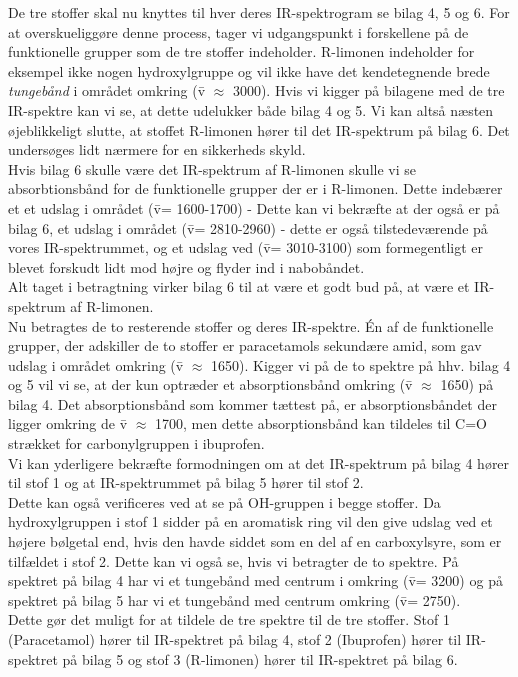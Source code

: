 De tre stoffer skal nu knyttes til hver deres IR-spektrogram se bilag 4, 5 og 6. For at overskueliggøre denne process, tager vi udgangspunkt i forskellene på de funktionelle grupper som de tre stoffer indeholder. R-limonen indeholder for eksempel ikke nogen hydroxylgruppe og vil ikke have det kendetegnende brede \emph{tungebånd} i området omkring (\={v} $\approx$ 3000). Hvis vi kigger på bilagene med de tre IR-spektre kan vi se, at dette udelukker både bilag 4 og 5. Vi kan altså næsten øjeblikkeligt slutte, at stoffet R-limonen hører til det IR-spektrum på bilag 6. Det undersøges lidt nærmere for en sikkerheds skyld. 
\\

Hvis bilag 6 skulle være det IR-spektrum af R-limonen skulle vi se absorbtionsbånd for de funktionelle grupper der er i R-limonen. Dette indebærer et et udslag i området (\={v}= 1600-1700) - Dette kan vi bekræfte at der også er på bilag 6, et udslag i området (\={v}= 2810-2960) - dette er også tilstedeværende på vores IR-spektrummet, og et udslag ved (\={v}= 3010-3100) som formegentligt er blevet forskudt lidt mod højre og flyder ind i nabobåndet. 
\\

Alt taget i betragtning virker bilag 6 til at være et godt bud på, at være et IR-spektrum af R-limonen.
\\

Nu betragtes de to resterende stoffer og deres IR-spektre. Én af de funktionelle grupper, der adskiller de to stoffer er paracetamols sekundære amid, som gav udslag i området omkring (\={v} $\approx$ 1650). Kigger vi på de to spektre på hhv. bilag 4 og 5 vil vi se, at der kun optræder et absorptionsbånd omkring (\={v} $\approx$ 1650) på bilag 4. Det absorptionsbånd som kommer tættest på, er absorptionsbåndet der ligger omkring de \={v} $\approx$ 1700, men dette absorptionsbånd kan tildeles til C=O strækket for carbonylgruppen i ibuprofen.
\\

Vi kan yderligere bekræfte formodningen om at det IR-spektrum på bilag 4 hører til stof 1 og at IR-spektrummet på bilag 5 hører til stof 2.
\\

Dette kan også verificeres ved at se på OH-gruppen i begge stoffer. Da hydroxylgruppen i stof 1 sidder på en aromatisk ring vil den give udslag ved et højere bølgetal end, hvis den havde siddet som en del af en carboxylsyre, som er tilfældet i stof 2. Dette kan vi også se, hvis vi betragter de to spektre. På spektret på bilag 4 har vi et tungebånd med centrum i omkring (\={v}= 3200) og på spektret på bilag 5 har vi et tungebånd med centrum omkring (\={v}= 2750).
\\

Dette gør det muligt for at tildele de tre spektre til de tre stoffer. Stof 1 (Paracetamol) hører til IR-spektret på bilag 4, stof 2 (Ibuprofen) hører til IR-spektret på bilag 5 og stof 3 (R-limonen) hører til IR-spektret på bilag 6.